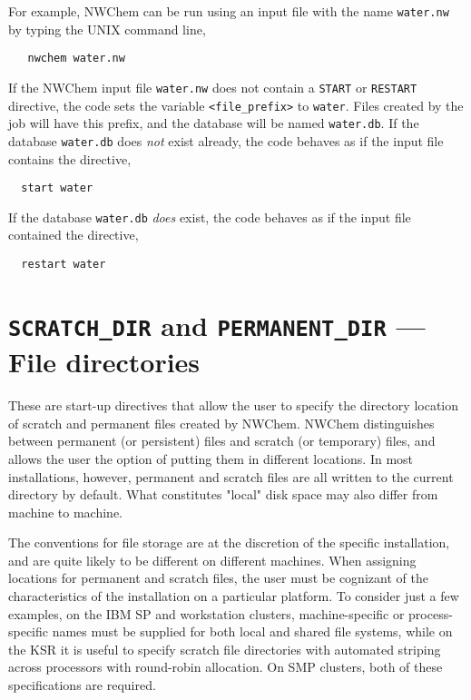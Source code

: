 For example, NWChem can be run using an input file with the name 
\verb+water.nw+ 
by typing the UNIX command line,

\begin{verbatim}
   nwchem water.nw
\end{verbatim}

If the NWChem input file \verb+water.nw+ does not contain
a \verb+START+  or \verb+RESTART+ directive, the code
sets the variable {\tt <file\_prefix>} to {\tt water}.  Files created
by the job will have this prefix, and the database will be named
{\tt water.db}.  If the database \verb+water.db+ does {\em not} exist already,
the code behaves as if the input file contains the directive,

\begin{verbatim}
  start water
\end{verbatim}

If the database \verb+water.db+ {\em does} exist,
the code behaves as if the input file contained the directive,

\begin{verbatim}
  restart water
\end{verbatim}


\section{{\tt SCRATCH\_DIR} and {\tt PERMANENT\_DIR} --- File directories}
\label{sec:dirs}

These are start-up directives that allow the user to specify the
directory location of scratch and permanent files created by NWChem.
NWChem distinguishes between permanent (or persistent) files and
scratch (or temporary) files, and allows the user the option of
putting them in different locations.  In most installations, however,
permanent and scratch files are all written to the current directory
by default.  What constitutes "local" disk space may also differ from 
machine to machine.

The conventions for file storage are at the discretion of the specific 
installation, and are quite likely to be different on different machines.  
When assigning locations for permanent and
scratch files,
the user must be cognizant of the characteristics of the installation
on a particular platform.
To consider just a few examples, on the IBM SP 
and workstation clusters, machine-specific or process-specific
names must be supplied for both local and shared file
systems, while on the KSR it is useful to specify scratch file directories
with automated striping across processors with round-robin allocation.
On SMP clusters, both of these specifications are required.  


